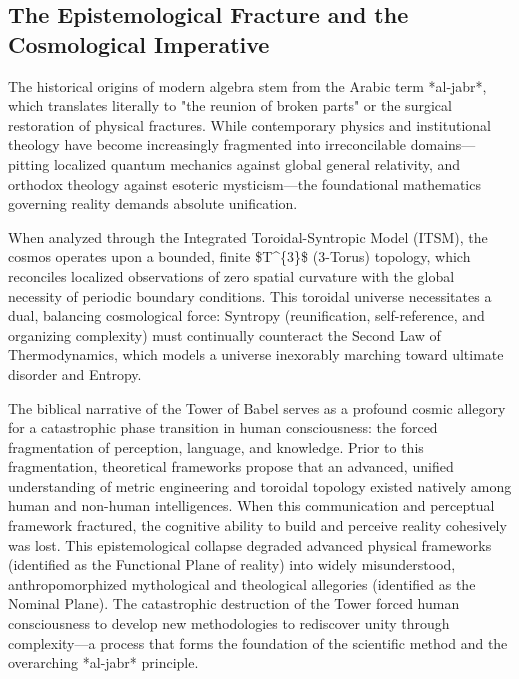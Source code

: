 \documentclass[aps,prd,11pt,onecolumn,superscriptaddress,nofootinbib,floatfix]{revtex4-2}
\begin{document}
\subsection{The Epistemological Fracture and the Cosmological Imperative}
The historical origins of modern algebra stem from the Arabic term *al-jabr*, which translates literally to "the reunion of broken parts" or the surgical restoration of physical fractures. While contemporary physics and institutional theology have become increasingly fragmented into irreconcilable domains---pitting localized quantum mechanics against global general relativity, and orthodox theology against esoteric mysticism---the foundational mathematics governing reality demands absolute unification.


When analyzed through the Integrated Toroidal-Syntropic Model (ITSM), the cosmos operates upon a bounded, finite \$T\textasciicircum{}\{3\}\$ (3-Torus) topology, which reconciles localized observations of zero spatial curvature with the global necessity of periodic boundary conditions. This toroidal universe necessitates a dual, balancing cosmological force: Syntropy (reunification, self-reference, and organizing complexity) must continually counteract the Second Law of Thermodynamics, which models a universe inexorably marching toward ultimate disorder and Entropy.


The biblical narrative of the Tower of Babel serves as a profound cosmic allegory for a catastrophic phase transition in human consciousness: the forced fragmentation of perception, language, and knowledge. Prior to this fragmentation, theoretical frameworks propose that an advanced, unified understanding of metric engineering and toroidal topology existed natively among human and non-human intelligences. When this communication and perceptual framework fractured, the cognitive ability to build and perceive reality cohesively was lost. This epistemological collapse degraded advanced physical frameworks (identified as the Functional Plane of reality) into widely misunderstood, anthropomorphized mythological and theological allegories (identified as the Nominal Plane). The catastrophic destruction of the Tower forced human consciousness to develop new methodologies to rediscover unity through complexity---a process that forms the foundation of the scientific method and the overarching *al-jabr* principle.
\end{document}
